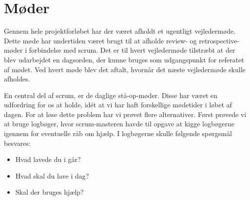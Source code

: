 \section{Møder}
Gennem hele projektforløbet har der været afholdt et ugentligt vejledermøde. Dette møde har undertiden været brugt til at afholde review- og retrospective-møder i forbindelse med scrum. Det er til hvert vejledermøde tilstræbt at der blev udarbejdet en dagsorden, der kunne bruges som udgangspunkt for referatet af mødet. Ved hvert møde blev det aftalt, hvornår det næste vejledermøde skulle afholdes. 


En central del af scrum, er de daglige stå-op-møder. Disse har været en udfordring for os at holde, idét at vi har haft forskellige mødetider i løbet af dagen. For at løse dette problem har vi prøvet flere alternativer. Først prøvede vi at bruge logbøger, hvor scrum-masteren havde til opgave at kigge logbøgerne igennem for eventuelle råb om hjælp. I logbøgerne skulle følgende spørgsmål besvares:

\begin{itemize}
	\item Hvad lavede du i går?
	\item Hvad skal du lave i dag?
	\item Skal der bruges hjælp?
\end{itemize} 


